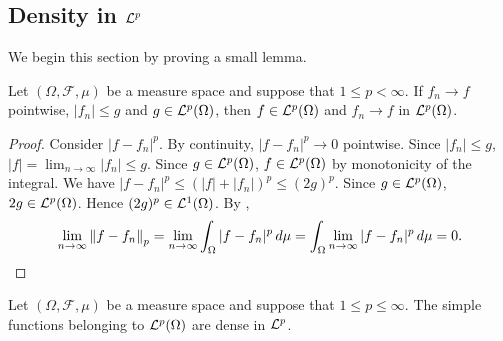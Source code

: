 
\subsection{Density in ${\mathcal {L}^p}$}

We begin this section by proving a small lemma.
\begin{lemma}
\label{lemma:lp:convg}
Let  $(\Omega, \mathcal{F}, \mu)$ be a measure space and suppose that $1 \leq p < \infty$.
If $f_n \rightarrow f$ pointwise, $|f_n| \leq g$ and $g \in {\mathcal {L}^p}(\Omega)$, then $f \in {\mathcal {L}^p}(\Omega)$ and  $f_n \rightarrow f$ in ${\mathcal {L}^p}(\Omega)$.
\end{lemma}
\begin{proof}
Consider $|f - f_n|^p$. By continuity, $|f - f_n|^p \to 0$ pointwise. Since $|f_n| \leq g$, $|f| = \lim_{n \to \infty} |f_n| \leq g$. Since $g \in {\mathcal {L}^p}(\Omega)$, $f \in {\mathcal {L}^p}(\Omega)$ by monotonicity of the integral. We have $| f - f_n |^p \leq (|f| + |f_n|)^p \leq (2 g)^p$.
Since $g \in {\mathcal {L}^p}(\Omega)$, $2g \in {\mathcal {L}^p}(\Omega)$. Hence $(2 g)^p \in {\mathcal {L}^1}(\Omega)$. By , 
\begin{align*}
     \lim_{n \to \infty} \left\lVert f - f_n\right\rVert_p = \lim_{n \to \infty} \int_\Omega  |f - f_n|^p \,d\mu = \int_\Omega  \lim_{n \to \infty}  |f - f_n|^p \,d\mu = 0.
\end{align*}
\end{proof}

\begin{theorem}
\label{thm:lp:density}
Let  $(\Omega, \mathcal{F}, \mu)$ be a measure space and suppose that $1 \leq p \leq \infty$.
The simple functions belonging to ${\mathcal {L}^p}(\Omega)$ are dense in ${\mathcal {L}^p}$.
\end{theorem}

